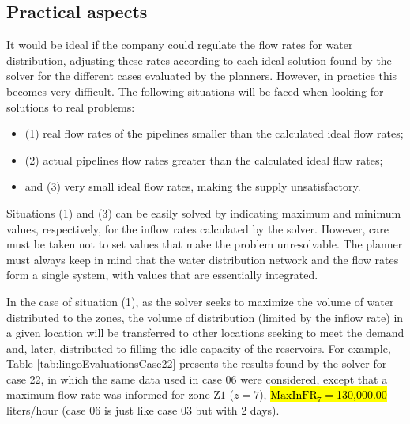 \documentclass{singlecol}
\theoremstyle{TH}{
\newtheorem{lemma}{Lemma}
\newtheorem{theorem}[lemma]{Theorem}
\newtheorem{corrolary}[lemma]{Corrolary}
\newtheorem{conjecture}[lemma]{Conjecture}
\newtheorem{proposition}[lemma]{Proposition}
\newtheorem{claim}[lemma]{Claim}
\newtheorem{stheorem}[lemma]{Wrong Theorem}
\newtheorem{algorithm}{Algorithm}
}
\theoremstyle{THrm}{
\newtheorem{definition}{Definition}[section]
\newtheorem{question}{Question}[section]
\newtheorem{remark}{Remark}
\newtheorem{scheme}{Scheme}
}
\theoremstyle{THhit}{
\newtheorem{case}{Case}[section]
}
\begin{document}
\subsection{Practical aspects}
\label{sec:praticalAspects}

It would be ideal if the company could regulate the flow rates for water distribution, adjusting these rates according to each ideal solution found by the solver for the different cases evaluated by the planners. However, in practice this becomes very difficult. The following situations will be faced when looking for solutions to real problems:

\begin{itemize}
\item (1) real flow rates of the pipelines smaller than the calculated ideal flow rates;
\item (2) actual pipelines flow rates greater than the calculated ideal flow rates;
\item and (3) very small ideal flow rates, making the supply unsatisfactory.
\end{itemize}

Situations (1) and (3) can be easily solved by indicating maximum and minimum values, respectively, for the inflow rates calculated by the solver. However, care must be taken not to set values that make the problem unresolvable. The planner must always keep in mind that the water distribution network and the flow rates form a single system, with values that are essentially integrated.

In the case of situation (1), as the solver seeks to maximize the volume of water distributed to the zones, the volume of distribution (limited by the inflow rate) in a given location will be transferred to other locations seeking to meet the demand and, later, distributed to filling the idle capacity of the reservoirs. For example, Table \ref{tab:lingoEvaluationsCase22} presents the results found by the solver for case 22, in which the same data used in case 06 were considered, except that a maximum flow rate was informed for zone $\mathrm{Z1}$ ($z = 7$), \hl{$\mathrm{MaxInFR}_7 = $130,000.00} liters/hour (case 06 is just like case 03 but with 2 days).
\end{document}
